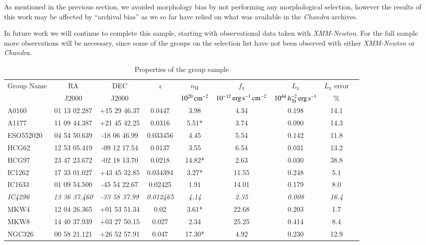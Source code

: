 \documentclass[structabstract]{aa}
\begin{document}
As mentioned in the previous section, we avoided morphology bias by not
performing any morphological selection, however the results of this work may
be affected by ``archival bias'' as we so far have relied on what was
available in the \emph{Chandra} archives.

In future work we will continue to complete this sample, starting with
observational data taken with \emph{XMM-Newton}. For the full sample more
observations will be necessary, since some of
the groups on the selection list have not been observed with either
\emph{XMM-Newton} or \emph{Chandra}.
\begin{table}
\begin{threeparttable}
\centering
\caption{Properties of the group sample}
\setlength\extrarowheight{2pt}
\begin{tabularx}{\textwidth}{Xcccccccl}\hline\hline
Group Name & RA & DEC & $z$ & $n_{\text{H}}$ & $f_{\text{x}}$ & $L_{\text{x}}$ & $L_{\text{x}}$ error \\ 
 & J2000 & J2000 & & $\unit[10^{20}]{cm^{-2}}$ & $\unit[10^{-12}]{erg\,s^{-1}\,cm^{-2}}$ &
$\unit[10^{44}\,h^{-2}_{70}]{erg\,s^{-1}}$ & \%\\ \hline
A0160  &  01 13 02.287  &  +15 29 46.37  & 0.0447 & 3.98 & 4.34 & 0.198 & 14.1 \\
A1177  &  11 09 44.387  &  +21 45 42.25  & 0.0316 & 5.51* & 3.74 & 0.090 & 14.3 \\ 
ESO552020  &  04 54 50.639  &  -18 06 46.99  & 0.033456 & 4.45 & 5.54 & 0.142 & 11.8 \\
HCG62  &  12 53 05.419  &  -09 12 17.54  & 0.0137 & 3.55 & 6.54 & 0.031 & 13.2 \\ 
HCG97  &  23 47 23.672  &  -02 18 13.70  & 0.0218 & 14.82* & 2.63 & 0.030 & 38.8 \\
IC1262  &  17 33 01.027  &  +43 45 32.85  & 0.034394 & 3.27* & 11.55 & 0.248 & 5.1 \\ 
IC1633  &  01 09 54.500  &  -45 54 22.67  & 0.02425 & 1.91 & 14.01 & 0.179 & 8.0 \\ 
\textit{IC4296} & \textit{13 36 37.460} & \textit{-33 58 37.99} &
\textit{0.012465} & \textit{4.14} & \textit{2.35} & \textit{0.008} &
\textit{16.4} \\
MKW4  &  12 04 26.365  &  +01 53 51.34  & 0.02 & 3.61* & 22.68 & 0.203 & 1.7 \\ 
MKW8  &  14 40 37.939  &  +03 27 50.15  & 0.027 & 2.34 & 25.25 & 0.414 & 8.4 \\ 
NGC326  &  00 58 21.121  &  +26 52 57.91  & 0.047 & 17.30* & 4.92 & 0.230 & 12.9 \\ 

\end{tabularx}
\end{threeparttable}
\end{table}
\end{document}
